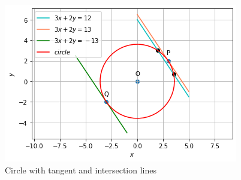 \documentclass[journal,12pt,twocolumn]{IEEEtran}
\begin{document}
\begin{figure}[!]
\includegraphics[width=1\columnwidth]{figure.png}
\caption{Circle with tangent and intersection lines}
\end{figure}


%
%
%
%
%
\end{document}
